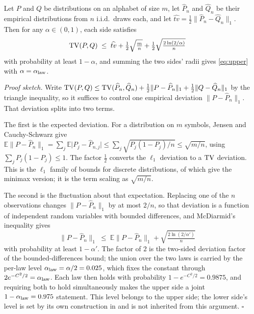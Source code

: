 \begin{lemma}
\label{lem:upper}
Let $P$ and $Q$ be distributions on an alphabet of size $m$, let
$\widehat{P}_n$ and $\widehat{Q}_n$ be their empirical distributions from $n$
i.i.d.\ draws each, and let
$\widehat{tv} = \tfrac{1}{2}\lVert \widehat{P}_n - \widehat{Q}_n\rVert_1$.
Then for any $\alpha \in (0,1)$, each side satisfies
\begin{equation}
  \mathrm{TV}(P,Q) \;\le\; \widehat{tv}
  + \tfrac{1}{2}\sqrt{\tfrac{m}{n}} + \tfrac{1}{2}\sqrt{\tfrac{2\ln(2/\alpha)}{n}}
  \label{eq:lem}
\end{equation}
with probability at least $1-\alpha$, and summing the two sides' radii gives
\eqref{eq:upper} with $\alpha = \alpha_{\mathrm{law}}$.
\end{lemma}

\emph{Proof sketch.} Write
$\mathrm{TV}(P,Q) \le \mathrm{TV}(\widehat{P}_n,\widehat{Q}_n)
+ \tfrac{1}{2}\lVert P - \widehat{P}_n\rVert_1
+ \tfrac{1}{2}\lVert Q - \widehat{Q}_n\rVert_1$
by the triangle inequality, so it suffices to control one empirical deviation
$\lVert P - \widehat{P}_n\rVert_1$. That deviation splits into two terms.

The first is the expected deviation. For a distribution on $m$ symbols,
Jensen and Cauchy-Schwarz give
$\mathbb{E}\lVert P - \widehat{P}_n\rVert_1
= \sum_j \mathbb{E}\lvert P_j - \widehat{P}_{n,j}\rvert
\le \sum_j \sqrt{P_j(1-P_j)/n} \le \sqrt{m/n}$,
using $\sum_j P_j(1-P_j) \le 1$. The factor $\tfrac12$ converts the $\ell_1$
deviation to a $\mathrm{TV}$ deviation. This is the $\ell_1$ family of bounds for
discrete distributions, of which \citet{han2015l1distribution} give the minimax
version; it is the term scaling as $\sqrt{m/n}$.

The second is the fluctuation about that expectation. Replacing one of the $n$
observations changes $\lVert P - \widehat{P}_n\rVert_1$ by at most $2/n$, so
that deviation is a function of independent random variables with bounded
differences, and McDiarmid's inequality gives
\begin{equation}
  \lVert P - \widehat{P}_n\rVert_1
  \;\le\; \mathbb{E}\lVert P - \widehat{P}_n\rVert_1
  + \sqrt{\tfrac{2\ln(2/\alpha')}{n}}
  \label{eq:mcdiarmid}
\end{equation}
with probability at least $1-\alpha'$. The factor of $2$ is the two-sided
deviation factor of the bounded-differences bound; the union over the two laws is
carried by the per-law level $\alpha_{\mathrm{law}} = \alpha/2 = 0.025$, which fixes the
constant through $2e^{-C^{2}/2} = \alpha_{\mathrm{law}}$. Each law then holds with probability
$1 - e^{-C^{2}/2} = 0.9875$, and requiring both to hold simultaneously makes the
upper side a joint $1 - \alpha_{\mathrm{law}} = 0.975$ statement. This level belongs to the upper
side; the lower side's level is set by its own construction in
 and is not inherited from this argument. $\square$

